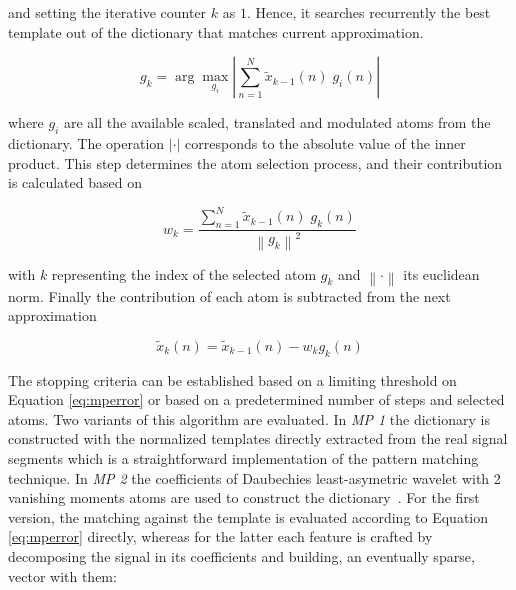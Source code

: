 \documentclass[brainsci,article,submit,moreauthors,pdftex,10pt,a4paper]{mdpi}
\begin{document}
\noindent and setting the iterative counter $k$ as $1$. Hence, it searches recurrently the best template out of the dictionary  that matches current approximation.  

\begin{equation}
g_{k} = \arg \max_{g_{i}} \left\lvert  \sum_{n=1}^{N} \tilde{x}_{k-1}(n) \; g_{i}(n) \right\rvert 
\label{eq:mp3}
\end{equation}

\noindent where $g_{i}$ are all the available scaled, translated and modulated atoms from the dictionary.  The operation $\left\lvert \cdot \right\rvert$ corresponds to the absolute value of the inner product.  This step determines the atom selection process, and their contribution is calculated based on 



\begin{equation}
w_{k} =  \frac{\sum_{n=1}^{N} \tilde{x}_{k-1}(n) \; g_{k}(n)}{  {\left\lVert  g_{k} \right\rVert}^{2} }
\label{eq:mp4}
\end{equation}

\noindent with $k$ representing the index of the selected atom $g_{k}$ and $\left\lVert \cdot \right\rVert$ its euclidean norm.  Finally the contribution of each atom is subtracted from the next approximation~\citep{Cohen2014,Sanei2007, Mallat1993}

\begin{equation}
\tilde{x}_{k}(n)=  \tilde{x}_{k-1}(n) - w_{k} g_{k} (n)
\label{eq:mp5}
\end{equation}

The stopping criteria can be established based on a limiting threshold on Equation \ref{eq:mperror} or based on a predetermined number of steps and selected atoms.  Two variants of this algorithm are evaluated. In \textit{MP 1} the dictionary is constructed with the normalized templates directly extracted from the real signal segments which is a straightforward implementation of the pattern matching technique.  In \textit{MP 2} the coefficients of Daubechies least-asymetric wavelet with 2 vanishing moments atoms are used to construct the dictionary~\citep{Vareka2012}.  For the first version, the matching against the template is evaluated according to Equation \ref{eq:mperror} directly, whereas for the latter each feature is crafted by decomposing the signal in its coefficients and building, an eventually sparse, vector with them:
\end{document}

